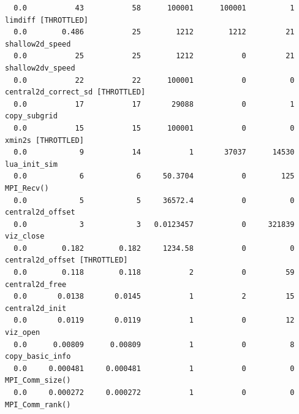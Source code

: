 \documentclass{article}
\begin{document}
{\begin{verbatim}
  0.0           43           58      100001      100001          1 limdiff [THROTTLED]
  0.0        0.486           25        1212        1212         21 shallow2d_speed 
  0.0           25           25        1212           0         21 shallow2dv_speed 
  0.0           22           22      100001           0          0 central2d_correct_sd [THROTTLED]
  0.0           17           17       29088           0          1 copy_subgrid 
  0.0           15           15      100001           0          0 xmin2s [THROTTLED]
  0.0            9           14           1       37037      14530 lua_init_sim 
  0.0            6            6     50.3704           0        125 MPI_Recv() 
  0.0            5            5     36572.4           0          0 central2d_offset 
  0.0            3            3   0.0123457           0     321839 viz_close 
  0.0        0.182        0.182     1234.58           0          0 central2d_offset [THROTTLED]
  0.0        0.118        0.118           2           0         59 central2d_free 
  0.0       0.0138       0.0145           1           2         15 central2d_init 
  0.0       0.0119       0.0119           1           0         12 viz_open 
  0.0      0.00809      0.00809           1           0          8 copy_basic_info 
  0.0     0.000481     0.000481           1           0          0 MPI_Comm_size() 
  0.0     0.000272     0.000272           1           0          0 MPI_Comm_rank()
\end{verbatim}
}
\end{document}
